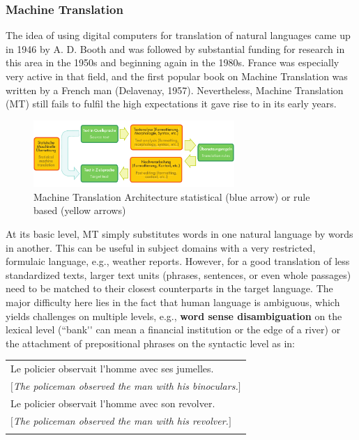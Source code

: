 \documentclass[]{../metanetpaper}
\begin{document}
\begin{multicols}{2}
\subsubsection{Machine Translation}
The idea of using digital computers for translation of natural
languages came up in 1946 by A. D. Booth and was followed by
substantial funding for research in this area in the 1950s and
beginning again in the 1980s. France was especially very active in
that field, and the first popular book on Machine Translation was
written by a French man (Delavenay, 1957). Nevertheless, Machine
Translation (MT) still fails to fulfil the high expectations it gave
rise to in its early years.

\begin{figure}
\begin{center}
 \includegraphics[width=3.0in]{../_media/machine_translation}
\caption{Machine Translation Architecture statistical (blue arrow) or rule based (yellow arrows)}
\label{fig:mtarchiEng}
\end{center}
\end{figure}

At its basic level, MT simply substitutes words in one natural
language by words in another. This can be useful in subject domains
with a very restricted, formulaic language, e.g., weather
reports. However, for a good translation of less standardized texts,
larger text units (phrases, sentences, or even whole passages) need to
be matched to their closest counterparts in the target language. The
major difficulty here lies in the fact that human language is
ambiguous, which yields challenges on multiple levels, e.g., {\bf word
sense disambiguation} on the lexical level (``bank{\mbox '}{\mbox '} can mean a financial institution or the edge of a river) or the attachment of prepositional phrases on the syntactic
level as in:
\begin{tabular}{l}
\\
Le policier observait l{\mbox '}homme avec ses jumelles.\\
$[${\it The policeman observed the man with his binoculars.}$]$\\
Le policier observait l{\mbox '}homme avec son revolver.\\
$[${\it The policeman observed the man with his revolver.}$]$\\
\\
\end{tabular}


\end{multicols}
\end{document}
